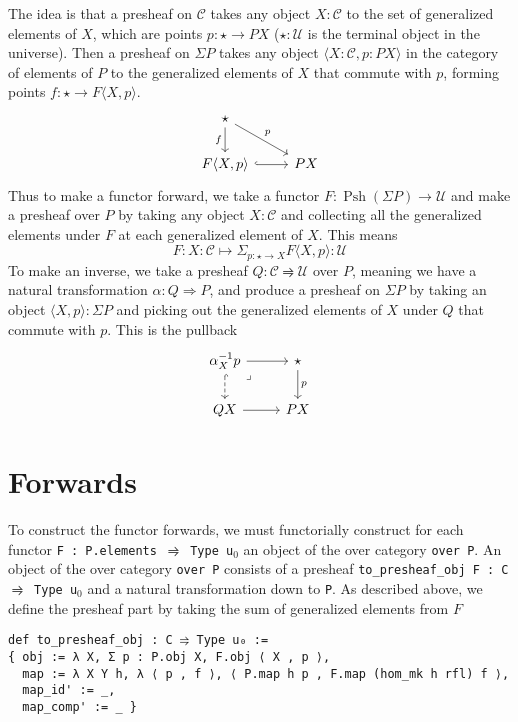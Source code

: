 \documentclass{article}
\DeclareMathOperator{\PSh}{Psh}
\newcommand{\functor}{\rightrightharpoons}
\renewcommand{\implies}{\Rightarrow}
\newcommand{\al}{\alpha}
\newcommand{\CC}{\mathcal{C}}
\newcommand{\UU}{\mathcal{U}}
\newcommand{\<}{\langle}
\renewcommand{\>}{\rangle}
\theoremstyle{definitionstyle}
\theoremstyle{exercisestyle}
\theoremstyle{remarkstyle}
\begin{document}
The idea is that a presheaf on $\CC$ takes any object $X : \CC$ to
the set of generalized elements of $X$, which are points
$p : \star \to P X$ ($\star : \UU$ is the terminal object in the universe).
Then a presheaf on $\Sigma P$ takes any object
$\< X : \CC , p : P X \>$ in the category of elements of $P$ to the
generalized elements of $X$ that commute with $p$,
forming points $f : \star \to F\< X , p \>$.
\[\begin{tikzcd}
	\star \\
	{F\<X,p\>} & P X
	\arrow["f"', from=1-1, to=2-1]
	\arrow["p", from=1-1, to=2-2]
	\arrow[hook, from=2-1, to=2-2]
\end{tikzcd}\]
Thus to make a functor forward, we take a functor $F : \PSh(\Sigma P) \to \UU$
and make a presheaf over $P$ by taking any object $X : \CC$ and
collecting all the generalized elements under $F$
at each generalized element of $X$.
This means
\[ F : X : \CC \mapsto \Sigma_{p : \star \to X} F \< X , p \> : \UU \]
To make an inverse, we take a presheaf $Q : \CC \functor \UU$ over $P$,
meaning we have a natural transformation $\al : Q \implies P$,
and produce a presheaf on $\Sigma P$ by taking an object $\< X,p \> : \Sigma P$
and picking out the generalized elements of $X$ under $Q$
that commute with $p$.
This is the pullback
\[\begin{tikzcd}
	{\alpha_X^{-1}p} & \star \\
	{Q X} & {P X}
	\arrow["p", from=1-2, to=2-2]
	\arrow[from=2-1, to=2-2]
	\arrow[from=1-1, to=1-2]
	\arrow[dashed, hook, from=1-1, to=2-1]
	\arrow["\lrcorner"{anchor=center, pos=0.125}, draw=none, from=1-1, to=2-2]
\end{tikzcd}\]

\section{Forwards}

To construct the functor forwards, we must functorially construct for each
functor \texttt{F : P.elements $\functor$ Type u}$_{0}$ an object of the
over category \texttt{over P}.
An object of the over category \texttt{over P} consists of a presheaf
\texttt{to\_presheaf\_obj F : C $\functor$ Type u}$_{0}$
and a natural transformation down to \texttt{P}.
As described above, we define the presheaf part by taking the sum
of generalized elements from $F$

\begin{lstlisting}
def to_presheaf_obj : C ⥤ Type u₀ :=
{ obj := λ X, Σ p : P.obj X, F.obj ⟨ X , p ⟩,
  map := λ X Y h, λ ⟨ p , f ⟩, ⟨ P.map h p , F.map (hom_mk h rfl) f ⟩,
  map_id' := _,
  map_comp' := _ } \end{lstlisting}
\end{document}

